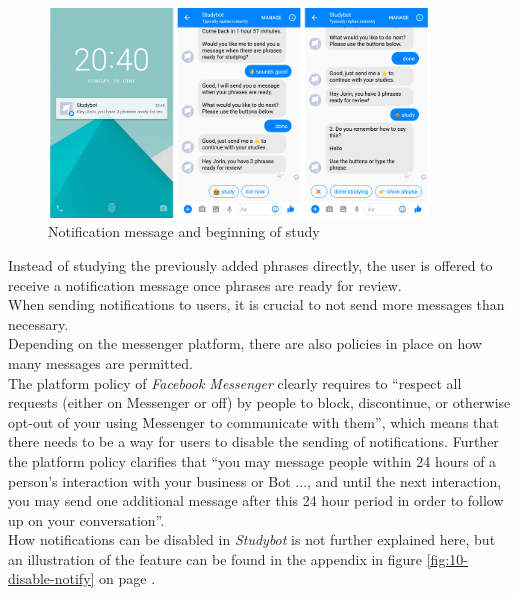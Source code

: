 \begin{figure}[h]
  \centering
  \includegraphics[width=0.9\textwidth]{images/interface/07-notify-study.png}
	\caption{Notification message and beginning of study}
	\label{fig:07-notify-study}
\end{figure}

Instead of studying the previously added phrases directly,
the user is offered to receive a notification message once phrases are ready for review.
\\

When sending notifications to users, it is crucial to not send more messages than necessary.
\\
Depending on the messenger platform, there are also policies in place on how many messages are permitted.
\\
The platform policy of \emph{Facebook Messenger} clearly requires to
``respect all requests (either on Messenger or off) by people to block, discontinue, or otherwise opt-out of your using Messenger to communicate with them''\cite{fbpolicy},
which means that there needs to be a way for users to disable the sending of notifications.
Further the platform policy clarifies that ``you may message people within 24 hours of a person's interaction with your business or Bot ..., and until the next interaction, you may send one additional message after this 24 hour period in order to follow up on your conversation''.\cite{fbpolicy}
\\
How notifications can be disabled in \emph{Studybot} is not further explained here,
but an illustration of the feature can be found in the appendix in figure \ref{fig:10-disable-notify} on page \pageref{fig:10-disable-notify}.
\\

